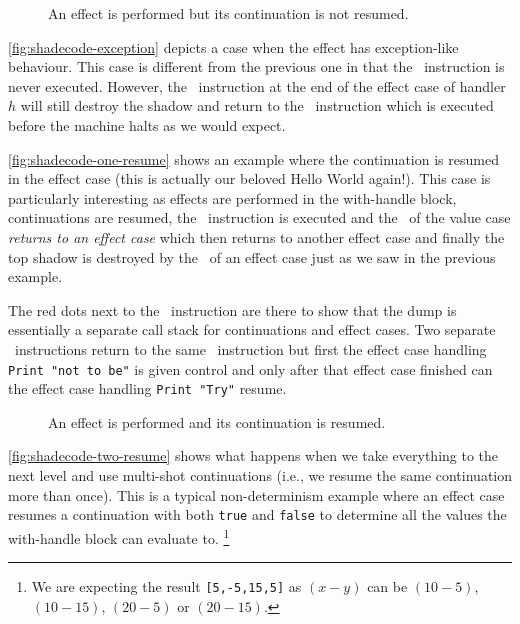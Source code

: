 \documentclass[class=article, crop=false]{standalone}
\begin{document}
\begin{figure}
    \centering
    \caption{An effect is performed but its continuation is not resumed.}
    \label{fig:shadecode-exception}
\end{figure}

\autoref{fig:shadecode-exception} depicts a case when the effect has exception-like
behaviour. This case is different from the previous one in that the \vmKillShadow\ instruction
is never executed. However, the \vmRett\ instruction at the end of the effect case of handler
$h$ will still destroy the shadow and return to the \vmFin\ instruction which is
executed before the machine halts as we would expect.

\autoref{fig:shadecode-one-resume} shows an example where the continuation is resumed
in the effect case (this is actually our beloved Hello World again!). This case is particularly
interesting as effects are performed in the with-handle block, continuations are resumed,
the \vmKillShadow\ instruction is executed and the \vmRett\ of the value case
\emph{returns to an effect case} which then returns to another effect case and
finally the top shadow is destroyed by the \vmRett\ of an effect case just as we
saw in the previous example.

The red dots next to the \vmApply\ instruction are there to show that the dump
is essentially a separate call stack for continuations and effect cases.
Two separate \vmRett\ instructions return to the same \vmApply\ instruction
but first the effect case handling \lstinline{Print "not to be"} is given
control and only after that effect case finished can the effect case handling
\lstinline{Print "Try"} resume.

\begin{figure}
    \centering
    \caption{An effect is performed and its continuation is resumed.}
    \label{fig:shadecode-one-resume}
\end{figure}
 
\autoref{fig:shadecode-two-resume} shows what happens when we take everything to
the next level and use multi-shot continuations (i.e., we resume the same continuation
more than once). This is a typical non-determinism example where an effect case resumes
a continuation with both \lstinline{true} and \lstinline{false} to determine all the
values the with-handle block can evaluate to.
\footnote{We are expecting the result \lstinline{[5,-5,15,5]} as $(x-y)$ can be $(10-5)$, $(10-15)$,
$(20-5)$ or $(20-15)$.}
\end{document}
